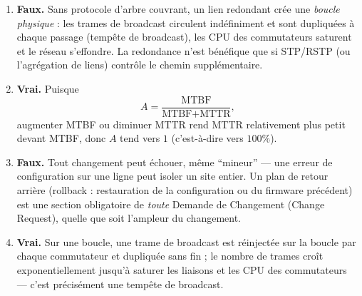 \documentclass[11pt]{article}
\newcommand{\cle}[1]{{\popxbold\color{popdark}#1}}
\begin{document}
\begin{corrige}
\begin{enumerate}
\item \textbf{Faux.} Sans protocole d'arbre couvrant, un lien redondant crée une \emph{boucle physique} : les trames de broadcast circulent indéfiniment et sont dupliquées à chaque passage (tempête de broadcast), les CPU des commutateurs saturent et le réseau s'effondre. La redondance n'est bénéfique que si STP/RSTP (ou l'agrégation de liens) contrôle le chemin supplémentaire.
\item \textbf{Vrai.} Puisque
\[ A = \frac{\text{MTBF}}{\text{MTBF}+\text{MTTR}}, \]
augmenter MTBF ou diminuer MTTR rend MTTR relativement plus petit devant MTBF, donc $A$ tend vers $1$ (c'est-à-dire vers $100\%$).
\item \textbf{Faux.} Tout changement peut échouer, même ``mineur'' --- une erreur de configuration sur une ligne peut isoler un site entier. Un \cle{plan de retour arrière} (rollback : restauration de la configuration ou du firmware précédent) est une section obligatoire de \emph{toute} Demande de Changement (Change Request), quelle que soit l'ampleur du changement.
\item \textbf{Vrai.} Sur une boucle, une trame de broadcast est réinjectée sur la boucle par chaque commutateur et dupliquée sans fin ; le nombre de trames croît exponentiellement jusqu'à saturer les liaisons et les CPU des commutateurs --- c'est précisément une tempête de broadcast.
\end{enumerate}
\end{corrige}
\end{document}
